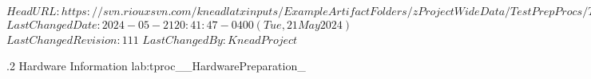 \svnidlong
{$HeadURL: https://svn.riouxsvn.com/kneadlatxinputs/ExampleArtifactFolders/zProjectWideData/TestPrepProcs/TestPrep_HardwareInformation.tex $}
{$LastChangedDate: 2024-05-21 20:41:47 -0400 (Tue, 21 May 2024) $}
{$LastChangedRevision: 111 $}
{$LastChangedBy: KneadProject $}

\TestProcedure  %
{\TestProcNumber.2}
{\StdTestNameX Hardware Information}
{lab:tproc_\StdTestName_HardwarePreparation_\TestProcNumber}
{
}
{
}
{
}
